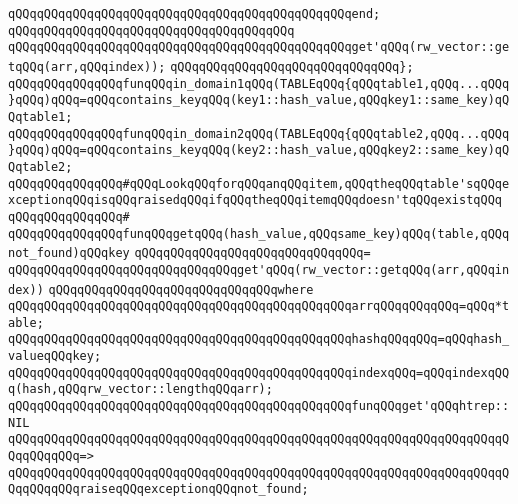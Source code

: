 \verb|qQQqqQQqqQQqqQQqqQQqqQQqqQQqqQQqqQQqqQQqqQQqqQQqend;|\newline
\verb|qQQqqQQqqQQqqQQqqQQqqQQqqQQqqQQqqQQqqQQq|\newline
\verb|qQQqqQQqqQQqqQQqqQQqqQQqqQQqqQQqqQQqqQQqqQQqqQQqget'qQQq(rw_vector::getqQQq(arr,qQQqindex));|\newline
\verb|qQQqqQQqqQQqqQQqqQQqqQQqqQQqqQQq};|\newline
\newline
\verb|qQQqqQQqqQQqqQQqfunqQQqin_domain1qQQq(TABLEqQQq{qQQqtable1,qQQq...qQQq}qQQq)qQQq=qQQqcontains_keyqQQq(key1::hash_value,qQQqkey1::same_key)qQQqtable1;|\newline
\verb|qQQqqQQqqQQqqQQqfunqQQqin_domain2qQQq(TABLEqQQq{qQQqtable2,qQQq...qQQq}qQQq)qQQq=qQQqcontains_keyqQQq(key2::hash_value,qQQqkey2::same_key)qQQqtable2;|\newline
\newline
\verb|qQQqqQQqqQQqqQQq#qQQqLookqQQqforqQQqanqQQqitem,qQQqtheqQQqtable'sqQQqexceptionqQQqisqQQqraisedqQQqifqQQqtheqQQqitemqQQqdoesn'tqQQqexistqQQq|\newline
\verb|qQQqqQQqqQQqqQQq#|\newline
\verb|qQQqqQQqqQQqqQQqfunqQQqgetqQQq(hash_value,qQQqsame_key)qQQq(table,qQQqnot_found)qQQqkey|\newline
\verb|qQQqqQQqqQQqqQQqqQQqqQQqqQQqqQQq=|\newline
\verb|qQQqqQQqqQQqqQQqqQQqqQQqqQQqqQQqget'qQQq(rw_vector::getqQQq(arr,qQQqindex))|\newline
\verb|qQQqqQQqqQQqqQQqqQQqqQQqqQQqqQQqwhere|\newline
\verb|qQQqqQQqqQQqqQQqqQQqqQQqqQQqqQQqqQQqqQQqqQQqqQQqarrqQQqqQQqqQQq=qQQq*table;|\newline
\verb|qQQqqQQqqQQqqQQqqQQqqQQqqQQqqQQqqQQqqQQqqQQqqQQqhashqQQqqQQq=qQQqhash_valueqQQqkey;|\newline
\verb|qQQqqQQqqQQqqQQqqQQqqQQqqQQqqQQqqQQqqQQqqQQqqQQqindexqQQq=qQQqindexqQQq(hash,qQQqrw_vector::lengthqQQqarr);|\newline
\newline
\verb|qQQqqQQqqQQqqQQqqQQqqQQqqQQqqQQqqQQqqQQqqQQqqQQqfunqQQqget'qQQqhtrep::NIL|\newline
\verb|qQQqqQQqqQQqqQQqqQQqqQQqqQQqqQQqqQQqqQQqqQQqqQQqqQQqqQQqqQQqqQQqqQQqqQQqqQQqqQQq=>|\newline
\verb|qQQqqQQqqQQqqQQqqQQqqQQqqQQqqQQqqQQqqQQqqQQqqQQqqQQqqQQqqQQqqQQqqQQqqQQqqQQqqQQqraiseqQQqexceptionqQQqnot_found;|\newline
\newline
